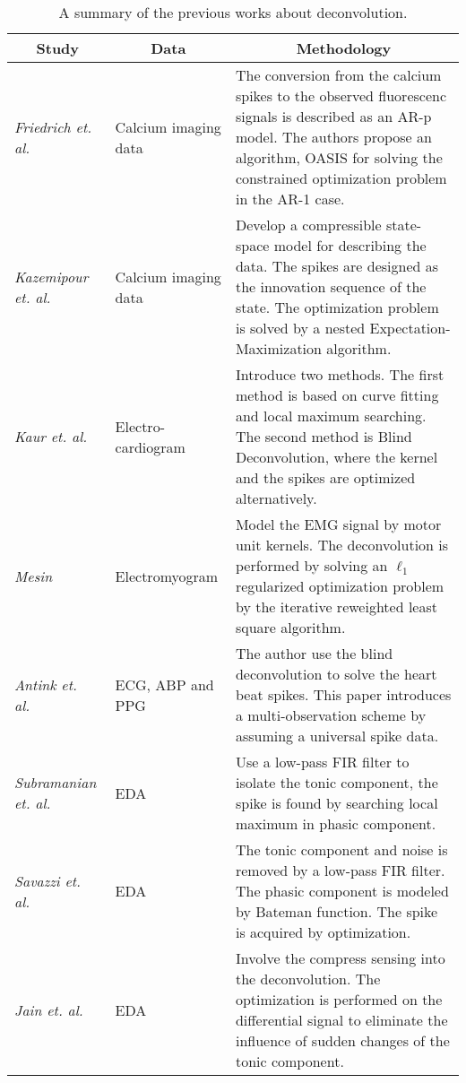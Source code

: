 \documentclass[10pt,conference]{ieeeconf}
\begin{document}
\begin{table*}[htbp]
  \centering
  \normalsize
  \caption{A summary of the previous works about deconvolution.}
  \label{tab:literature}
  \begin{tabular}{m{}<{\raggedright}m{}<{\raggedright}m{}}
    \toprule
    \multicolumn{1}{c}{Study} & \multicolumn{1}{c}{Data} & \multicolumn{1}{c}{Methodology} \\ \midrule
    \textit{Friedrich et. al.}~\cite{friedrich2017fast} & Calcium imaging data & The conversion from the calcium spikes to the observed fluorescenc signals is described as an AR-p model. The authors propose an algorithm, OASIS for solving the constrained optimization problem in the AR-1 case. \\
    \textit{Kazemipour et. al.}~\cite{kazemipour2017fast} & Calcium imaging data & Develop a compressible state-space model for describing the data. The spikes are designed as the innovation sequence of the state. The optimization problem is solved by a nested Expectation-Maximization algorithm. \\
    \textit{Kaur et. al.}~\cite{kaur2016remote} & Electro-cardiogram & Introduce two methods. The first method is based on curve fitting and local maximum searching. The second method is Blind Deconvolution, where the kernel and the spikes are optimized alternatively. \\
    \textit{Mesin}~\cite{mesin2019single} & Electromyogram & Model the EMG signal by motor unit kernels. The deconvolution is performed by solving an $\ell_1$ regularized optimization problem by the iterative reweighted least square algorithm. \\
    \textit{Antink et. al.}~\cite{friedrich2017fast} & ECG, ABP and PPG & The author use the blind deconvolution to solve the heart beat spikes. This paper introduces a multi-observation scheme by assuming a universal spike data. \\
    \textit{Subramanian et. al.}~\cite{subramanian2019systematic} & EDA & Use a low-pass FIR filter to isolate the tonic component, the spike is found by searching local maximum in phasic component. \\ 
    \textit{Savazzi et. al.}~\cite{savazzi2019estimation} & EDA & The tonic component and noise is removed by a low-pass FIR filter. The phasic component is modeled by Bateman function. The spike is acquired by optimization. \\ 
    \textit{Jain et. al.}~\cite{jain2016compressed} & EDA & Involve the compress sensing into the deconvolution. The optimization is performed on the differential signal to eliminate the influence of sudden changes of the tonic component. \\

\end{tabular}
\end{table*}
\end{document}

